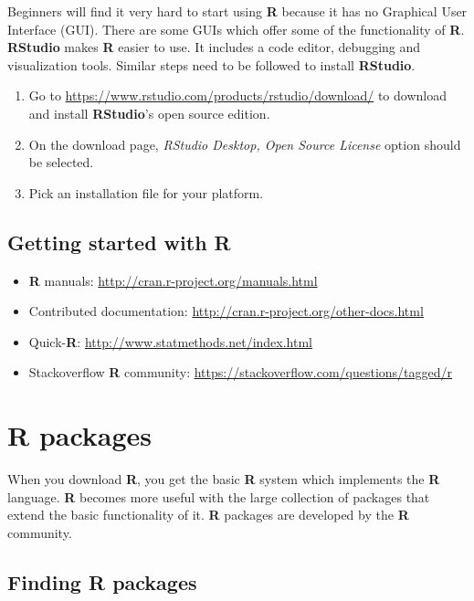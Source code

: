 \documentclass[10pt,b5paper,]{book}
\providecommand{\tightlist}{%
  \setlength{\itemsep}{0pt}\setlength{\parskip}{0pt}}
\theoremstyle{definition}
\theoremstyle{definition}
\theoremstyle{definition}
\theoremstyle{remark}
\begin{document}
Beginners will find it very hard to start using \textbf{R} because it
has no Graphical User Interface (GUI). There are some GUIs which offer
some of the functionality of \textbf{R}. \textbf{RStudio} makes
\textbf{R} easier to use. It includes a code editor, debugging and
visualization tools. Similar steps need to be followed to install
\textbf{RStudio}.

\begin{enumerate}
\def\labelenumi{\arabic{enumi}.}
\tightlist
\item
  Go to \url{https://www.rstudio.com/products/rstudio/download/} to
  download and install \textbf{RStudio}'s open source edition.
\item
  On the download page, \emph{RStudio Desktop, Open Source License}
  option should be selected.
\item
  Pick an installation file for your platform.
\end{enumerate}

\hypertarget{getting-started-with-r}{%
\subsection{Getting started with R}\label{getting-started-with-r}}

\begin{itemize}
\tightlist
\item
  \textbf{R} manuals: \url{http://cran.r-project.org/manuals.html}
\item
  Contributed documentation:
  \url{http://cran.r-project.org/other-docs.html}
\item
  Quick-\textbf{R}: \url{http://www.statmethods.net/index.html}
\item
  Stackoverflow \textbf{R} community:
  \url{https://stackoverflow.com/questions/tagged/r}
\end{itemize}

\hypertarget{r-packages}{%
\section{R packages}\label{r-packages}}

When you download \textbf{R}, you get the basic \textbf{R} system which
implements the \textbf{R} language. \textbf{R} becomes more useful with
the large collection of packages that extend the basic functionality of
it. \textbf{R} packages are developed by the \textbf{R} community.

\hypertarget{finding-r-packages}{%
\subsection{Finding R packages}\label{finding-r-packages}}
\end{document}
